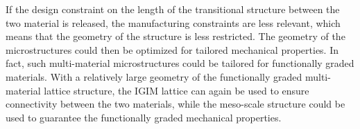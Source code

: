 If the design constraint on the length of the transitional structure between the two material is released,
the manufacturing constraints are less relevant, which means that the geometry of the structure is less restricted.
The geometry of the microstructures could then be optimized for tailored mechanical properties.
In fact, such multi-material microstructures could be tailored for functionally graded materials.
With a relatively large geometry of the functionally graded multi-material lattice structure,
the IGIM lattice can again be used to ensure connectivity between the two materials,
while the meso-scale structure could be used to guarantee the functionally graded mechanical properties.
